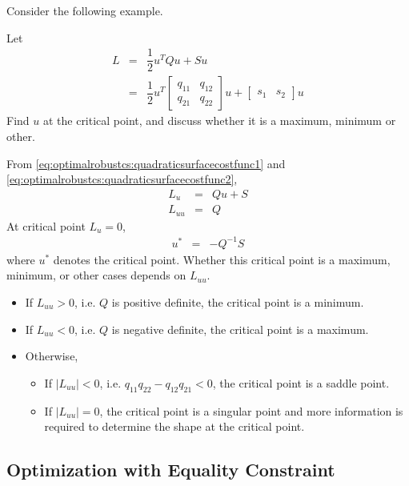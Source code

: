 Consider the following example.
\begin{shortbox}

Let
\begin{eqnarray}
	L &=& \dfrac{1}{2}u^TQu + Su \label{eq:optimalrobustcs:quadraticsurfacecostfunc1} \\
	&=& \dfrac{1}{2}u^T\left[\begin{array}{cc}
		q_{11} & q_{12} \\
		q_{21} & q_{22}
	\end{array}\right]u + \left[\begin{array}{cc}
	s_1 & s_2
	\end{array}\right]u \label{eq:optimalrobustcs:quadraticsurfacecostfunc2}
\end{eqnarray}
Find $u$ at the critical point, and discuss whether it is a maximum, minimum or other.

\end{shortbox}

From \eqref{eq:optimalrobustcs:quadraticsurfacecostfunc1} and \eqref{eq:optimalrobustcs:quadraticsurfacecostfunc2},
\begin{eqnarray}
	L_u &=& Qu + S \nonumber \\
	L_{uu} &=& Q \nonumber 
\end{eqnarray}
At critical point $L_u=0$,
\begin{eqnarray}
	u^* &=& -Q^{-1}S \nonumber
\end{eqnarray}
where $u^*$ denotes the critical point. Whether this critical point is a maximum, minimum, or other cases depends on $L_{uu}$. 
\begin{itemize}
	\item If $L_{uu}>0$, i.e. $Q$ is positive definite, the critical point is a minimum.
	\item If $L_{uu}<0$, i.e. $Q$ is negative definite, the critical point is a maximum.
	\item Otherwise, \begin{itemize}
		\item If $|L_{uu}|<0$, i.e. $q_{11}q_{22}-q_{12}q_{21}<0$, the critical point is a saddle point.
		\item If $|L_{uu}|=0$, the critical point is a singular point and more information is required to determine the shape at the critical point.
	\end{itemize}
\end{itemize}

\subsection{Optimization with Equality Constraint}

